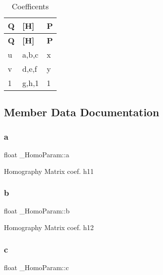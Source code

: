 \hypertarget{struct___homo_param_multi_row}{}
\tabulinesep=1mm
\begin{longtabu} spread 0pt [c]{*{3}{|X[-1]}|}
\caption{Coefficents}\label{struct___homo_param_multi_row}\\
\hline
\rowcolor{\tableheadbgcolor}\textbf{ Q }&\textbf{ \mbox{[}H\mbox{]} }&\textbf{ P }\\
\endfirsthead
\hline
\endfoot
\hline
\rowcolor{\tableheadbgcolor}\textbf{ Q }&\textbf{ \mbox{[}H\mbox{]} }&\textbf{ P }\\
\endhead
u&a,b,c&x \\
v&d,e,f&y \\
1&g,h,1&1 \\
\end{longtabu}


\subsection{Member Data Documentation}
\mbox{\label{struct___homo_param_a115e689b4a04a4c084199abd52ada276}} 
\subsubsection{\texorpdfstring{a}{a}}
{\footnotesize\ttfamily float \+\_\+\+Homo\+Param\+::a}

Homography Matrix coef. h11 \mbox{\label{struct___homo_param_a6bf6d63208b553c9b23389b4757062ba}} 
\subsubsection{\texorpdfstring{b}{b}}
{\footnotesize\ttfamily float \+\_\+\+Homo\+Param\+::b}

Homography Matrix coef. h12 \mbox{\label{struct___homo_param_a14f426f73e6461dce1be2019115601c0}} 
\subsubsection{\texorpdfstring{c}{c}}
{\footnotesize\ttfamily float \+\_\+\+Homo\+Param\+::c}

